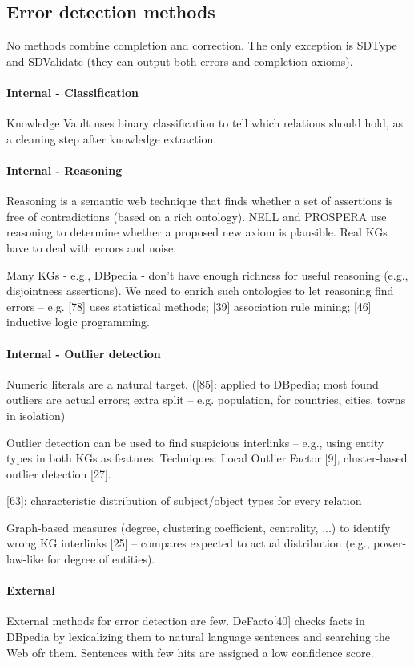 \subsection{Error detection methods}
No methods combine completion and correction. The only exception is SDType and
SDValidate (they can output both errors and completion axioms).

\paragraph{Internal - Classification}
Knowledge Vault uses binary classification to tell which relations should hold,
as a cleaning step after knowledge extraction.

\paragraph{Internal - Reasoning}
Reasoning is a semantic web technique that finds whether a set of assertions is
free of contradictions (based on a rich ontology).
NELL and PROSPERA use reasoning to determine whether a proposed new axiom is
plausible. Real KGs have to deal with errors and noise.

Many KGs - e.g., DBpedia - don't have enough richness for useful reasoning
(e.g., disjointness assertions). We need to enrich such ontologies to let
reasoning find errors -- e.g. [78] uses statistical methods; [39] association
rule mining; [46] inductive logic programming.

\paragraph{Internal - Outlier detection}
Numeric literals are a natural target. ([85]: applied to DBpedia; most found
outliers are actual errors; extra split -- e.g. population, for countries,
cities, towns in isolation)

Outlier detection can be used to find suspicious interlinks -- e.g., using
entity types in both KGs as features.
Techniques: Local Outlier Factor [9], cluster-based outlier detection [27].

[63]: characteristic distribution of subject/object types for every relation

Graph-based measures (degree, clustering coefficient, centrality, ...) to
identify wrong KG interlinks [25] -- compares expected to actual distribution
(e.g., power-law-like for degree of entities).

\paragraph{External}
External methods for error detection are few.
DeFacto[40] checks facts in DBpedia by lexicalizing them to natural language
sentences and searching the Web ofr them. Sentences with few hits are assigned
a low confidence score.

